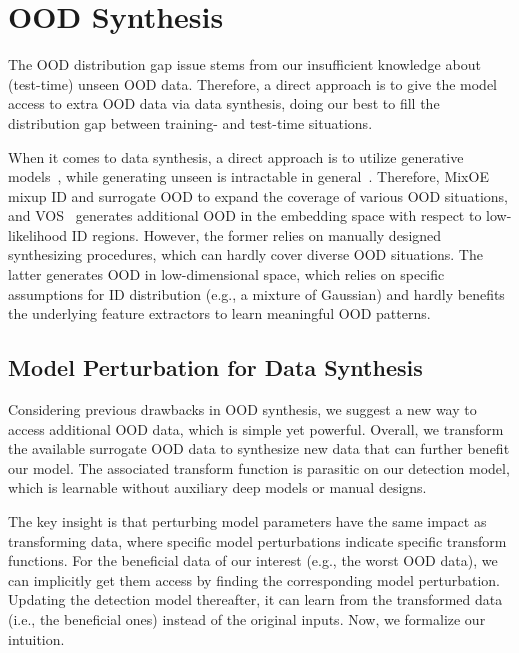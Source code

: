 \documentclass{article} \usepackage{iclr2022_conference,times}
\begin{document}
\section{OOD Synthesis}

The OOD distribution gap issue stems from our insufficient knowledge about (test-time) unseen OOD data. Therefore, a direct approach is to give the model access to extra OOD data via data synthesis, doing our best to fill the distribution gap between training- and test-time situations.

When it comes to data synthesis, a direct approach is to utilize generative models~\citep{LeeLLS18}, while generating unseen is intractable in general~\citep{du2022vos}. Therefore, MixOE~\citep{zhang2021mixture} mixup ID and surrogate OOD to expand the coverage of various OOD situations, and VOS~\citep{du2022vos} generates additional OOD in the embedding space with respect to low-likelihood ID regions. However, the former relies on manually designed synthesizing procedures, which can hardly cover diverse OOD situations. The latter generates OOD in low-dimensional space, which relies on specific assumptions for ID distribution (e.g., a mixture of Gaussian) and hardly benefits the underlying feature extractors to learn meaningful OOD patterns. 








\subsection{Model Perturbation for Data Synthesis} \label{sec: motivation}


Considering previous drawbacks in OOD synthesis, we suggest a new way to access additional OOD data, which is simple yet powerful. Overall, we transform the available surrogate OOD data to synthesize new data that can further benefit our model. The associated transform function is parasitic on our detection model, which is learnable without auxiliary deep models or manual designs. 


The key insight is that perturbing model parameters have the same impact as transforming data, where specific model perturbations indicate specific transform functions. {For the beneficial data of our interest (e.g., the worst OOD data), we can implicitly get them access by finding the corresponding model perturbation. Updating the detection model thereafter, it can learn from the transformed data (i.e., the beneficial ones) instead of the original inputs.} Now, we formalize our intuition. 
\end{document}
